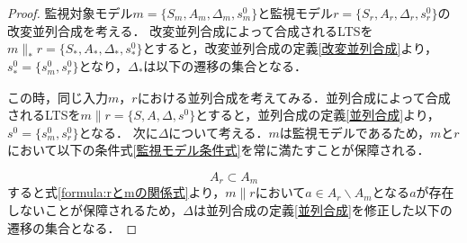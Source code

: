 \begin{proof}
    監視対象モデル$m = \{S_{m}, A_{m}, \Delta_{m}, s^0_{m}\}$と監視モデル$r = \{S_{r}, A_{r}, \Delta_{r}, s^0_{r}\}$の改変並列合成を考える．
    改変並列合成によって合成されるLTSを$m \parallel_* r = \{S_{*}, A_{*}, \Delta_{*}, s^0_{*}\}$とすると，改変並列合成の定義\ref{改変並列合成}より，$s^0_{*} = \{ s^0_{m}, s^0_{r} \}$となり，$\Delta_{*}$は以下の遷移の集合となる．
    
    \renewcommand{\baselinestretch}{0.0}
    \allowdisplaybreaks[0]
    \renewcommand{\baselinestretch}{1}

    この時，同じ入力$m$，$r$における並列合成を考えてみる．並列合成によって合成されるLTSを$m \parallel r = \{S, A, \Delta, s^0\}$とすると，並列合成の定義\ref{並列合成}より，$s^0 = \{ s^0_{m}, s^0_{r} \}$となる．
    次に$\Delta$について考える．$m$は監視モデルであるため，$m$と$r$において以下の条件式\ref{監視モデル条件式}を常に満たすことが保障される．
    
    \renewcommand{\baselinestretch}{0.0}
    \allowdisplaybreaks[4]
    \begin{equation}
    \label{formula:rとmの関係式}
    A_{r} \subset A_{m}
    \end{equation}
    \allowdisplaybreaks[0]
    \renewcommand{\baselinestretch}{1}
    すると式\ref{formula:rとmの関係式}より，$m \parallel r$において$a \in A_{r} \backslash A_{m}$となる$a$が存在しないことが保障されるため，$\Delta$は並列合成の定義\ref{並列合成}を修正した以下の遷移の集合となる．
    
    \renewcommand{\baselinestretch}{0.0}
    \allowdisplaybreaks[0]
    \renewcommand{\baselinestretch}{1}


\end{proof}
